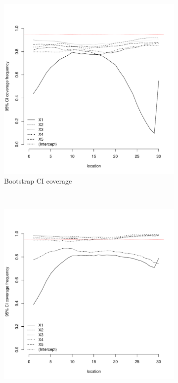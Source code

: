 \documentclass[authoryear, review, 11pt]{elsarticle}
\begin{document}
\begin{figure}
	\vspace{-30mm}
	\centering
	\begin{subfigure}[b]{0.45\textwidth}
	\centering
		\includegraphics[width=\textwidth]{../../figures/simulation/15.20.profile_bootstrap_coverage.pdf}
		\caption{Bootstrap CI coverage}
	\end{subfigure}%
	~ %
	\begin{subfigure}[b]{0.45\textwidth}
	\centering
		\includegraphics[width=\textwidth]{../../figures/simulation/15.20.profile_se_coverage.pdf}

\end{subfigure}
\end{figure}
\end{document}
